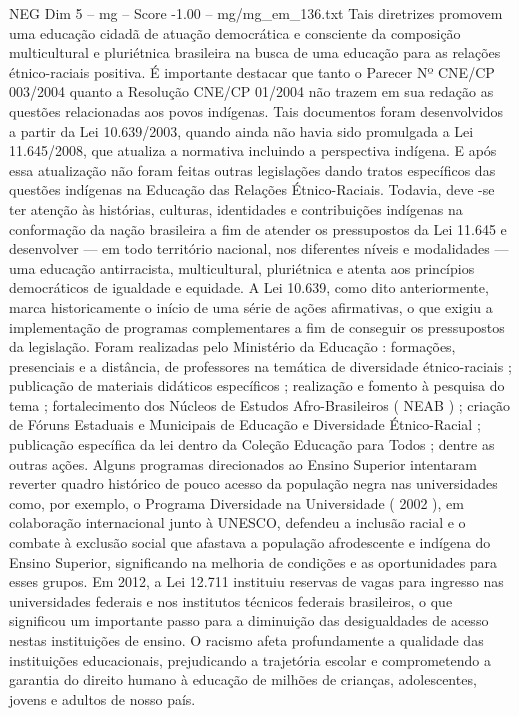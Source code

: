 \begin{textsample}{NEG Dim 5 – mg – Score -1.00 – mg/mg\_em\_136.txt}
Tais diretrizes promovem uma educação cidadã de atuação democrática e consciente da composição multicultural e pluriétnica brasileira na busca de uma educação para as relações étnico-raciais positiva.
É importante destacar que tanto o Parecer Nº CNE/CP 003/2004 quanto a Resolução CNE/CP 01/2004 não trazem em sua redação as questões relacionadas aos povos indígenas.
Tais documentos foram desenvolvidos a partir da Lei 10.639/2003, quando ainda não havia sido promulgada a Lei 11.645/2008, que atualiza a normativa incluindo a perspectiva indígena.
E após essa atualização não foram feitas outras legislações dando tratos específicos das questões indígenas na Educação das Relações Étnico-Raciais.
Todavia, deve -se ter atenção às histórias, culturas, identidades e contribuições indígenas na conformação da nação brasileira a fim de atender os pressupostos da Lei 11.645 e desenvolver — em todo território nacional, nos diferentes níveis e modalidades — uma educação antirracista, multicultural, pluriétnica e atenta aos princípios democráticos de igualdade e equidade.
A Lei 10.639, como dito anteriormente, marca historicamente o início de uma série de ações afirmativas, o que exigiu a implementação de programas complementares a fim de conseguir os pressupostos da legislação.
Foram realizadas pelo Ministério da Educação : formações, presenciais e a distância, de professores na temática de diversidade étnico-raciais ; publicação de materiais didáticos específicos ; realização e fomento à pesquisa do tema ; fortalecimento dos Núcleos de Estudos Afro-Brasileiros ( NEAB ) ; criação de Fóruns Estaduais e Municipais de Educação e Diversidade Étnico-Racial ; publicação específica da lei dentro da Coleção Educação para Todos ; dentre as outras ações.
Alguns programas direcionados ao Ensino Superior intentaram reverter quadro histórico de pouco acesso da população negra nas universidades como, por exemplo, o Programa Diversidade na Universidade ( 2002 ), em colaboração internacional junto à UNESCO, defendeu a inclusão racial e o combate à exclusão social que afastava a população afrodescente e indígena do Ensino Superior, significando na melhoria de condições e as oportunidades para esses grupos.
Em 2012, a Lei 12.711 instituiu reservas de vagas para ingresso nas universidades federais e nos institutos técnicos federais brasileiros, o que significou um importante passo para a diminuição das desigualdades de acesso nestas instituições de ensino.
O racismo afeta profundamente a qualidade das instituições educacionais, prejudicando a trajetória escolar e comprometendo a garantia do direito humano à educação de milhões de crianças, adolescentes, jovens e adultos de nosso país.

\end{textsample}
